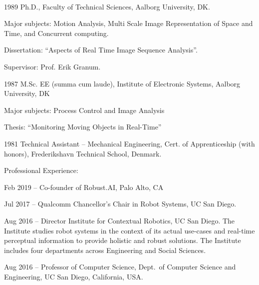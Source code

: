\documentclass{article}
\newenvironment{sublist}{%
  \begin{list}{}{%
      \setlength{\itemsep}{0em}\setlength{\parsep}{0em}%
      \setlength{\topsep}{0em}\setlength{\parskip}{0em}%
    }%
}%
{ \end{list} }
\begin{document}
\begin{cv}
  \begin{cvlist}{~}
  \item[1989] Ph.D., Faculty of Technical Sciences, Aalborg
    University, DK.
    \begin{sublist}
    \item Major subjects: Motion Analysis, Multi Scale Image
      Representation of Space and Time, and Concurrent computing.
    \item Dissertation: ``Aspects of Real Time Image Sequence
      Analysis''.
    \item Supervisor: Prof. Erik Granum.
    \end{sublist}
  \item[1987] M.Sc. EE (summa cum laude), Institute of Electronic
    Systems, Aalborg University, DK
    \begin{sublist}
    \item Major subjects: Process Control and Image Analysis
    \item Thesis: ``Monitoring Moving Objects in Real-Time''
    \end{sublist}
  \item[1981] Technical Assistant -- Mechanical Engineering, Cert.
    of Apprenticeship (with honors), Frederikshavn Technical
    School, Denmark.
\end{cvlist}



\begin{cvlist}{Professional Experience:}

\item[Feb 2019 --] Co-founder of Robust.AI, Palo Alto, CA 

\item[Jul 2017 --] Qualcomm Chancellor's Chair in Robot Systems, UC San Diego.

\item[Aug 2016 --] Director Institute for Contextual Robotics, UC San
  Diego. The Institute studies robot systems in the context of its
  actual use-cases and real-time perceptual information to provide
  holistic and robust solutions. The Institute includes four
  departments across Engineering and Social Sciences.

\item[Aug 2016 --] Professor of Computer Science, Dept.\ of Computer
  Science and Engineering, UC San Diego, California, USA.


\end{cvlist}
\end{cv}
\end{document}

